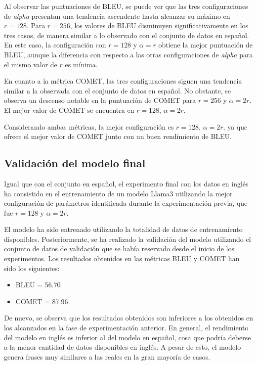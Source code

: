 \documentclass[11pt,spanish,listoffigures,listoftables]{tfgetsinf}
\begin{document}
Al observar las puntuaciones de BLEU, se puede ver que las tres configuraciones de \textit{alpha} presentan una tendencia ascendente hasta alcanzar su máximo en $r = 128$. Para $r = 256$, los valores de BLEU disminuyen significativamente en los tres casos, de manera similar a lo observado con el conjunto de datos en español. En este caso, la configuración con $r = 128$ y $\alpha = r$ obtiene la mejor puntuación de BLEU, aunque la diferencia con respecto a las otras configuraciones de \textit{alpha} para el mismo valor de $r$ es mínima.

En cuanto a la métrica COMET, las tres configuraciones siguen una tendencia similar a la observada con el conjunto de datos en español. No obstante, se observa un descenso notable en la puntuación de COMET para $r = 256$ y $\alpha = 2r$. El mejor valor de COMET se encuentra en $r = 128$, $\alpha = 2r$.

Considerando ambas métricas, la mejor configuración es $r = 128$, $\alpha = 2r$, ya que ofrece el mejor valor de COMET junto con un buen rendimiento de BLEU.

\subsection{Validación del modelo final}

Igual que con el conjunto en español, el experimento final con los datos en inglés ha consistido en el entrenamiento de un modelo Llama3 utilizando la mejor configuración de parámetros identificada durante la experimentación previa, que fue $r = 128$ y $\alpha = 2r$.

El modelo ha sido entrenado utilizando la totalidad de datos de entrenamiento disponibles. Posteriormente, se ha realizado la validación del modelo utilizando el conjunto de datos de validación que se había reservado desde el inicio de los experimentos. Los resultados obtenidos en las métricas BLEU y COMET han sido los siguientes:

\begin{itemize}
	\item BLEU = 56.70
	\item COMET = 87.96
\end{itemize}

De nuevo, se observa que los resultados obtenidos son inferiores a los obtenidos en los alcanzados en la fase de experimentación anterior. En general, el rendimiento del modelo en inglés es inferior al del modelo en español, cosa que podría deberse a la menor cantidad de datos disponibles en inglés. A pesar de esto, el modelo genera frases muy similares a las reales en la gran mayoría de casos.
\end{document}
